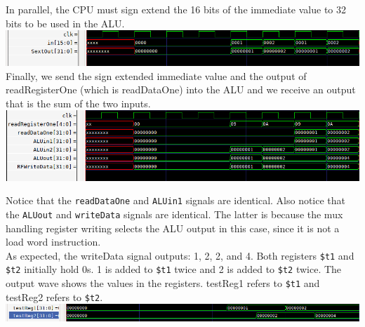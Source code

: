 \documentclass[twocolumn]{article}
\newcommand{\cc}[1]{\texttt{#1}}
\begin{document}
In parallel, the CPU must sign extend the 16 bits of the immediate value to 32 bits to be used in the ALU. \\
\vspace{0.5em}
\begingroup
    \centering
    \medskip
    \includegraphics[width=\columnwidth]{Lab-Tex/Lab4-images/p1_3.png}
    \medskip
\endgroup
Finally, we send the sign extended immediate value and the output of readRegisterOne (which is readDataOne) into the ALU and we receive an output that is the sum of the two inputs.\\
\vspace{0.5em}
\begingroup
    \centering
    \medskip
    \includegraphics[width=\columnwidth]{Lab-Tex/Lab4-images/p1_4.png}
    \medskip
\endgroup

\newpage

Notice that the \cc{readDataOne} and \cc{ALUin1} signals are identical. Also notice that the \cc{ALUout} and \cc{writeData} signals are identical. The latter is because the mux handling register writing selects the ALU output in this case, since it is not a load word instruction.\\

As expected, the writeData signal outputs: 1, 2, 2, and 4. Both registers \cc{\$t1} and \cc{\$t2} initially hold 0s. 1 is added to \cc{\$t1} twice and 2 is added to \cc{\$t2} twice. The output wave shows the values in the registers. testReg1 refers to \cc{\$t1} and testReg2 refers to \cc{\$t2}.\\

\begingroup
    \centering
    \medskip
    \includegraphics[width=\columnwidth]{Lab-Tex/Lab4-images/p1_5.png}
    \medskip
\endgroup
\end{document}
